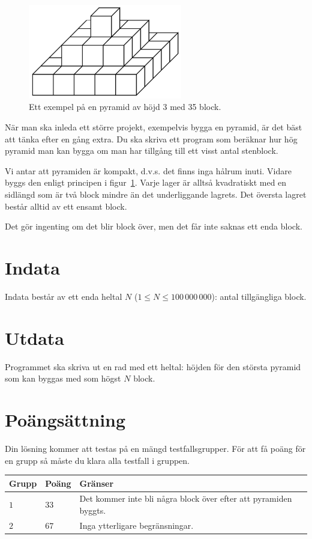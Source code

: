 
\begin{figure}[h!]
\centering
    \includegraphics[width=0.6\textwidth]{pyramid.png}
  \caption{Ett exempel på en pyramid av höjd 3 med 35 block.}
\label{fig:pyramid}
\end{figure}

När man ska inleda ett större projekt, exempelvis bygga en pyramid, är det bäst att tänka efter en gång extra.
Du ska skriva ett program som beräknar hur hög pyramid man kan bygga om man har tillgång till ett visst antal stenblock.

Vi antar att pyramiden är kompakt, d.v.s. det finns inga hålrum inuti.
Vidare byggs den enligt principen i figur~\ref{fig:pyramid}.
Varje lager är alltså kvadratiskt med en sidlängd som är två block mindre än det underliggande lagrets.
Det översta lagret består alltid av ett ensamt block.

Det gör ingenting om det blir block över, men det får inte saknas ett enda block.

\section*{Indata}
Indata består av ett enda heltal $N$ ($1 \le N \le 100\,000\,000$): antal tillgängliga block.

\section*{Utdata}
Programmet ska skriva ut en rad med ett heltal: höjden för den största pyramid som kan byggas med som högst $N$ block.

\section*{Poängsättning}
Din lösning kommer att testas på en mängd testfallsgrupper.
För att få poäng för en grupp så måste du klara alla testfall i gruppen.


\noindent
\begin{tabular}{| l | l | p{12cm} |}
  \hline
  \textbf{Grupp} & \textbf{Poäng} & \textbf{Gränser} \\ \hline
  $1$    & $33$        & Det kommer inte bli några block över efter att pyramiden byggts. \\ \hline
  $2$    & $67$        & Inga ytterligare begränsningar. \\ \hline
\end{tabular}
